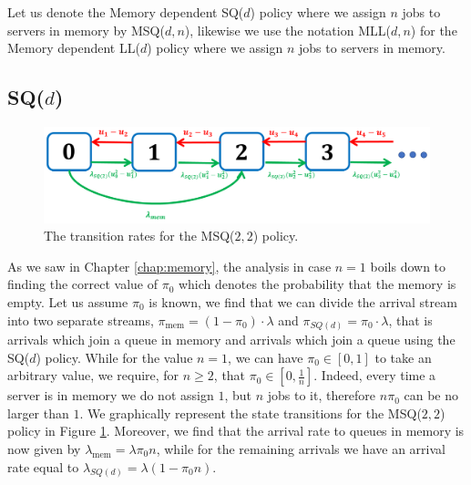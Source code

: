 \documentclass[12pt]{report}
\begin{document}
Let us denote the Memory dependent SQ($d$) policy where we assign $n$ jobs to servers in memory by MSQ($d,n$), likewise we use the notation MLL($d, n$) for the Memory dependent LL($d$) policy where we assign $n$ jobs to servers in memory.

\subsection{SQ($d$)}
\begin{figure}
\begin{center}
\includegraphics[scale=0.5]{figures/Chapter8/memory_n_diagram.PNG}
\end{center}
\caption{The transition rates for the MSQ($2, 2$) policy.} \label{fig:memory_n_diagram}
\end{figure}
As we saw in Chapter \ref{chap:memory}, the analysis in case $n=1$ boils down to finding the correct value of $\pi_0$ which denotes the probability that the memory is empty. Let us assume $\pi_0$ is known, we find that we can divide the arrival stream into two separate streams, $\pi_{\mbox{mem}} = (1-\pi_0) \cdot \lambda$ and $\pi_{SQ(d)} = \pi_0 \cdot \lambda$, that is arrivals which join a queue in memory and arrivals which join a queue using the SQ($d$) policy. While for the value $n=1$, we can have $\pi_0 \in [0,1]$ to take an arbitrary value, we require, for $n \geq 2$, that $\pi_0 \in [0,\frac{1}{n}]$. Indeed, every time a server is in memory we do not assign $1$, but $n$ jobs to it, therefore $n \pi_0$ can be no larger than $1$. We graphically represent the state transitions for the MSQ($2,2$) policy in Figure \ref{fig:memory_n_diagram}. Moreover, we find that the arrival rate to queues in memory is now given by $\lambda_{\mbox{mem}} = \lambda \pi_0 n$, while for the remaining arrivals we have an arrival rate equal to $\lambda_{SQ(d)} = \lambda (1- \pi_0 n)$.
\end{document}
